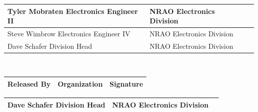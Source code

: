 \documentclass[titlepage]{article}
\renewcommand{\arraystretch}{1.4}
\begin{document}
\begin{center}
\begin{tabular}{|w{l}{3cm}|m{3.5cm}|m{6.93cm}|}
{        Tyler Mobraten Electronics Engineer II
        } & NRAO Electronics Division \raggedright &  \\ 
        \hline
        \parbox{3cm}{\raggedright
        Steve Wimbrow Electronics Engineer IV
        } & NRAO Electronics Division \raggedright &  \\ 
        \hline
        \parbox{3cm}{\raggedright
        Dave Schafer Division Head
        } & NRAO Electronics Division \raggedright &  \\ 
        \hline
    \end{tabular} \\
    \renewcommand{\arraystretch}{1}
    \vspace*{0.8cm}
    \begin{tabular}{|m{3cm}|m{3.5cm}|m{6.93cm}|} \hline
        \rowcolor{nraoblue}
        \textbf{Released By} & \textbf{Organization} & \textbf{Signature} \\ \hline
    \end{tabular}
    \renewcommand{\arraystretch}{1.5}
    \begin{tabular}{|m{3cm}|m{3.5cm}|m{6.93cm}|} \hline
        \parbox{3cm}{\raggedright
        Dave Schafer Division Head
        } & NRAO Electronics Division \raggedright &  \\ 
        \hline
    \end{tabular}
    \renewcommand{\arraystretch}{1}
\end{center}

\newpage
\end{document}
